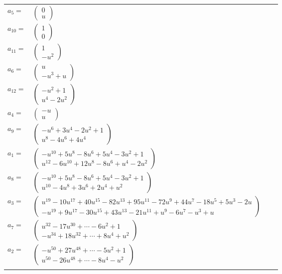 \documentclass[1p]{elsarticle_modified}
\theoremstyle{definition}
\begin{document}
\begin{tabular}{m{7pt} m{180pt} m{7pt} m{180pt} }
\flushright $a_{5}=$&$\begin{pmatrix}0\\u\end{pmatrix}$ \\
\flushright $a_{10}=$&$\begin{pmatrix}1\\0\end{pmatrix}$ \\
\flushright $a_{11}=$&$\begin{pmatrix}1\\- u^2\end{pmatrix}$ \\
\flushright $a_{6}=$&$\begin{pmatrix}u\\- u^3+u\end{pmatrix}$ \\
\flushright $a_{12}=$&$\begin{pmatrix}- u^2+1\\u^4-2 u^2\end{pmatrix}$ \\
\flushright $a_{4}=$&$\begin{pmatrix}- u\\u\end{pmatrix}$ \\
\flushright $a_{9}=$&$\begin{pmatrix}- u^6+3 u^4-2 u^2+1\\u^8-4 u^6+4 u^4\end{pmatrix}$ \\
\flushright $a_{1}=$&$\begin{pmatrix}- u^{10}+5 u^8-8 u^6+5 u^4-3 u^2+1\\u^{12}-6 u^{10}+12 u^8-8 u^6+u^4-2 u^2\end{pmatrix}$ \\
\flushright $a_{8}=$&$\begin{pmatrix}- u^{10}+5 u^8-8 u^6+5 u^4-3 u^2+1\\u^{10}-4 u^8+3 u^6+2 u^4+u^2\end{pmatrix}$ \\
\flushright $a_{3}=$&$\begin{pmatrix}u^{19}-10 u^{17}+40 u^{15}-82 u^{13}+95 u^{11}-72 u^9+44 u^7-18 u^5+5 u^3-2 u\\- u^{19}+9 u^{17}-30 u^{15}+43 u^{13}-21 u^{11}+u^9-6 u^7- u^3+u\end{pmatrix}$ \\
\flushright $a_{7}=$&$\begin{pmatrix}u^{32}-17 u^{30}+\cdots-6 u^2+1\\- u^{34}+18 u^{32}+\cdots+8 u^4+u^2\end{pmatrix}$ \\
\flushright $a_{2}=$&$\begin{pmatrix}- u^{50}+27 u^{48}+\cdots-5 u^2+1\\u^{50}-26 u^{48}+\cdots-8 u^4- u^2\end{pmatrix}$\\&\end{tabular}
\end{document}
